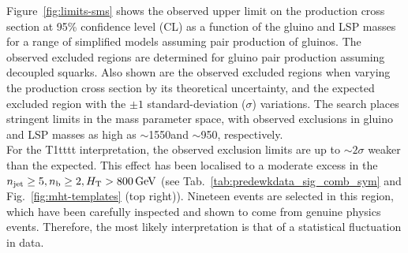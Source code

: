 Figure~\ref{fig:limits-sms} shows the observed upper limit on the
production cross section at 95\% confidence level (CL) as a function
of the gluino and LSP masses for a range of simplified models assuming
pair production of gluinos. The observed excluded regions are
determined for gluino pair production assuming decoupled squarks. Also
shown are the observed excluded regions when varying the production
cross section by its theoretical uncertainty, and the expected
excluded region with the ${\pm}1$ standard-deviation ($\sigma$)
variations. The search places stringent limits in the mass parameter
space, with observed exclusions in gluino and LSP masses as high as
$\sim$1550\gev and $\sim$950\gev, respectively. \\
For the T1tttt interpretation, the observed exclusion limits are up to
$\sim 2\sigma$ weaker than the expected. This effect has been
localised to a moderate excess in the $n_{\text{jet}}\geq5, n_{\text{b}}\geq2, H_{\mathrm{T}} >
800 \, \mathrm{GeV}$ (see Tab.~\ref{tab:predewkdata_sig_comb_sym} and
Fig.~\ref{fig:mht-templates} (top right)).  Nineteen events are
selected in this region, which have been carefully inspected and shown
to come from genuine physics events.  Therefore, the most likely
interpretation is that of a statistical fluctuation in data.



\clearpage


\clearpage



